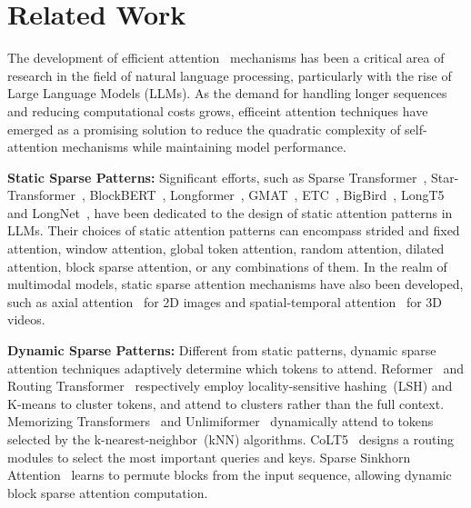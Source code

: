 \section{Related Work}


The development of efficient attention~\citep{tay2020efficient} mechanisms has been a critical area of research in the field of natural language processing, particularly with the rise of Large Language Models (LLMs). As the demand for handling longer sequences and reducing computational costs grows, efficeint attention techniques have emerged as a promising solution to reduce the quadratic complexity of self-attention mechanisms while maintaining model performance.

\textbf{Static Sparse Patterns:}
Significant efforts, such as Sparse Transformer~\citep{child2019generating}, Star-Transformer~\citep{guo2019star}, BlockBERT~\citep{qiu2019blockwise}, Longformer~\citep{beltagy2020longformer},
GMAT~\citep{gupta2020gmat}, ETC~\citep{ainslie2020etc},
BigBird~\citep{zaheer2020big}, LongT5~\citep{guo2021longt5} and LongNet~\citep{ding2023longnet}, have been dedicated to the design of static attention patterns in LLMs. 
Their choices of static attention patterns can encompass strided and fixed attention, window attention, global token attention, random attention, dilated attention, block sparse attention, or any combinations of them. 
In the realm of multimodal models, static sparse attention mechanisms have also been developed, such as axial attention~\citep{ho2019axial} for 2D images and spatial-temporal attention~\citep{opensora} for 3D videos.

\textbf{Dynamic Sparse Patterns:}
Different from static patterns, dynamic sparse attention techniques adaptively determine which tokens to attend. 
Reformer~\citep{kitaev2020reformer} and Routing Transformer~\citep{roy2021efficient} respectively employ locality-sensitive hashing~(LSH) and K-means to cluster tokens, and attend to clusters rather than the full context. Memorizing Transformers~\citep{wu2022memorizing} and Unlimiformer~\citep{bertsch2024unlimiformer} dynamically attend to tokens selected by the k-nearest-neighbor~(kNN) algorithms. 
CoLT5~\citep{ainslie2023colt5} designs a routing modules to select the most important queries and keys.
%
Sparse Sinkhorn Attention~\citep{tay2020sparse} learns to permute blocks from the input sequence, allowing dynamic block sparse attention computation.


